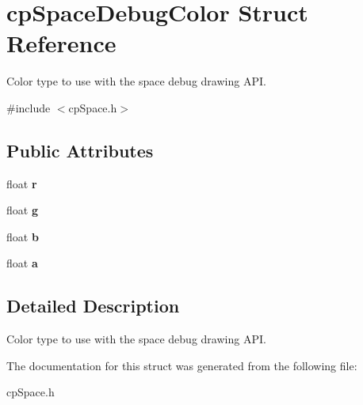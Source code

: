 \hypertarget{structcp_space_debug_color}{}\section{cp\+Space\+Debug\+Color Struct Reference}
\label{structcp_space_debug_color}


Color type to use with the space debug drawing A\+P\+I.  




{\ttfamily \#include $<$cp\+Space.\+h$>$}

\subsection*{Public Attributes}
\begin{DoxyCompactItemize}
\item 
\hypertarget{structcp_space_debug_color_a8363abb3839ece1a2ea672e15054c31d}{}float {\bfseries r}\label{structcp_space_debug_color_a8363abb3839ece1a2ea672e15054c31d}

\item 
\hypertarget{structcp_space_debug_color_a842d9ced4b2d71df6de850c5c6580ef0}{}float {\bfseries g}\label{structcp_space_debug_color_a842d9ced4b2d71df6de850c5c6580ef0}

\item 
\hypertarget{structcp_space_debug_color_a4580b42ba3db2e7d945c224920ab8526}{}float {\bfseries b}\label{structcp_space_debug_color_a4580b42ba3db2e7d945c224920ab8526}

\item 
\hypertarget{structcp_space_debug_color_a9abbf5d9f4e3df34653ab5fc438e3b62}{}float {\bfseries a}\label{structcp_space_debug_color_a9abbf5d9f4e3df34653ab5fc438e3b62}

\end{DoxyCompactItemize}


\subsection{Detailed Description}
Color type to use with the space debug drawing A\+P\+I. 

The documentation for this struct was generated from the following file\+:\begin{DoxyCompactItemize}
\item 
cp\+Space.\+h\end{DoxyCompactItemize}
